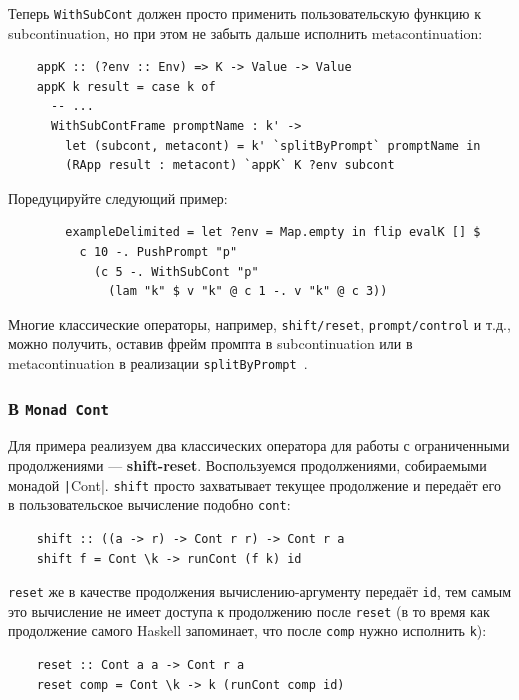 Теперь \texttt{WithSubCont} должен просто применить пользовательскую функцию к subcontinuation, но при этом не забыть дальше исполнить metacontinuation:
\begin{verbatim}
    appK :: (?env :: Env) => K -> Value -> Value
    appK k result = case k of
      -- ...
      WithSubContFrame promptName : k' ->
        let (subcont, metacont) = k' `splitByPrompt` promptName in
        (RApp result : metacont) `appK` K ?env subcont
\end{verbatim}

\begin{task}
    Поредуцируйте следующий пример:
    \begin{verbatim}
        exampleDelimited = let ?env = Map.empty in flip evalK [] $
          c 10 -. PushPrompt "p"
            (c 5 -. WithSubCont "p"
              (lam "k" $ v "k" @ c 1 -. v "k" @ c 3))
    \end{verbatim}
\end{task}

Многие классические операторы, например, \texttt{shift/reset}, \texttt{prompt/control} и т.д., можно получить, оставив фрейм промпта в subcontinuation или в metacontinuation в реализации \texttt{splitByPrompt}~\cite{dyvbig2007monadic}.

\subsubsection{В \texttt{Monad Cont}}


Для примера реализуем два классических оператора для работы с ограниченными продолжениями --- \textbf{shift-reset}.
Воспользуемся продолжениями, собираемыми монадой \texttt|Cont|.
\texttt{shift} просто захватывает текущее продолжение и передаёт его в пользовательское вычисление подобно \texttt{cont}:
\begin{verbatim}
    shift :: ((a -> r) -> Cont r r) -> Cont r a
    shift f = Cont \k -> runCont (f k) id
\end{verbatim}
\texttt{reset} же в качестве продолжения вычислению-аргументу передаёт \texttt{id}, тем самым это вычисление не имеет доступа к продолжению после \texttt{reset} (в то время как продолжение самого Haskell запоминает, что после \texttt{comp} нужно исполнить \texttt{k}):
\begin{verbatim}
    reset :: Cont a a -> Cont r a
    reset comp = Cont \k -> k (runCont comp id)
\end{verbatim}

